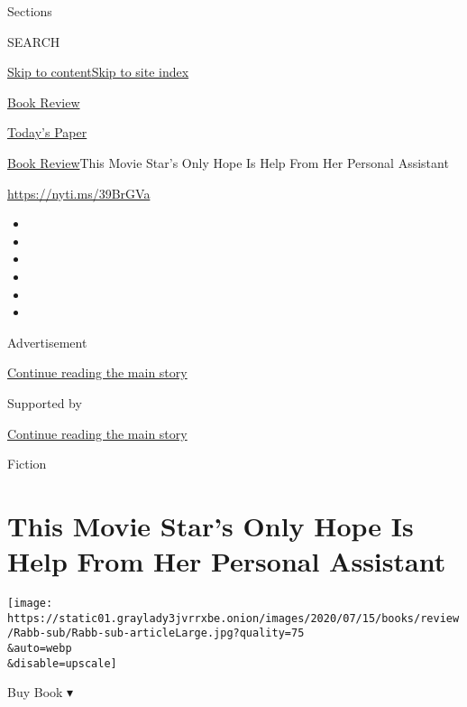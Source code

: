 Sections

SEARCH

\protect\hyperlink{site-content}{Skip to
content}\protect\hyperlink{site-index}{Skip to site index}

\href{https://www.nytimes3xbfgragh.onion/section/books/review}{Book
Review}

\href{https://myaccount.nytimes3xbfgragh.onion/auth/login?response_type=cookie\&client_id=vi}{}

\href{https://www.nytimes3xbfgragh.onion/section/todayspaper}{Today's
Paper}

\href{/section/books/review}{Book Review}\textbar{}This Movie Star's
Only Hope Is Help From Her Personal Assistant

\url{https://nyti.ms/39BrGVa}

\begin{itemize}
\item
\item
\item
\item
\item
\item
\end{itemize}

Advertisement

\protect\hyperlink{after-top}{Continue reading the main story}

Supported by

\protect\hyperlink{after-sponsor}{Continue reading the main story}

Fiction

\hypertarget{this-movie-stars-only-hope-is-help-from-her-personal-assistant}{%
\section{This Movie Star's Only Hope Is Help From Her Personal
Assistant}\label{this-movie-stars-only-hope-is-help-from-her-personal-assistant}}

\texttt{[image: https://static01.graylady3jvrrxbe.onion/images/2020/07/15/books/review/Rabb-sub/Rabb-sub-articleLarge.jpg?quality=75\\\&auto=webp\\\&disable=upscale]}

Buy Book ▾

